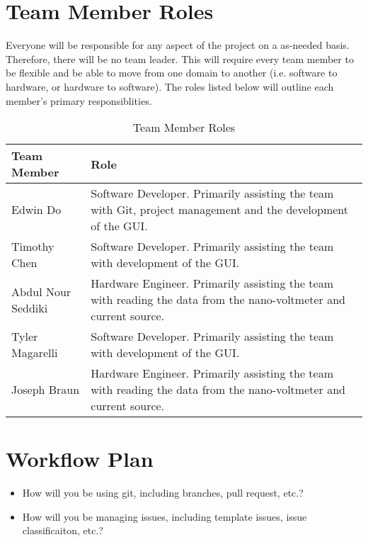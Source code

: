 \documentclass{article}
\begin{document}
\section{Team Member Roles}
\indent Everyone will be responsible for any aspect of the project on a as-needed basis. Therefore, there will be no team leader.
This will require every team member to be flexible and be able to move from one domain to another (i.e. software to hardware, or hardware to software).
The roles listed below will outline each member's primary responsiblities.
\begin{table}[h!]
    \centering

	
    \begin{tabular}{p{} p{}}

    \toprule
    \textbf{Team Member} & \textbf{Role}\\

    \midrule{Edwin Do} & Software Developer. Primarily assisting the team with Git, project management and the development of the GUI. \\
    \midrule{Timothy Chen} & Software Developer. Primarily assisting the team with development of the GUI. \\
    \midrule{Abdul Nour Seddiki} & Hardware Engineer. Primarily assisting the team with reading the data from the nano-voltmeter and current source. \\
    \midrule{Tyler Magarelli} & Software Developer. Primarily assisting the team with development of the GUI. \\
    \midrule{Joseph Braun} & Hardware Engineer. Primarily assisting the team with reading the data from the nano-voltmeter and current source.  \\

    \bottomrule

    \end{tabular}
    \caption{Team Member Roles}
\end{table}


\section{Workflow Plan}

\begin{itemize}
	\item How will you be using git, including branches, pull request, etc.?
	\item How will you be managing issues, including template issues, issue
	classificaiton, etc.?
\end{itemize}
\end{document}
